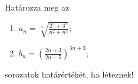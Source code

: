 \documentclass[11pt]{scrartcl}
\begin{document}
Határozza meg az
\begin{enumerate}
	\item \(\displaystyle
	      a_n = \sqrt[n]{\frac{2^n + 3^n}{n^2 + n^3}};
	      \)

	\item \(\displaystyle
	      b_n = \left(
	      \frac{2n + 3}{2n - 5}
	      \right)^{3n + 3};
	      \)
\end{enumerate}
sorozatok határértékét, ha léteznek!
\end{document}
